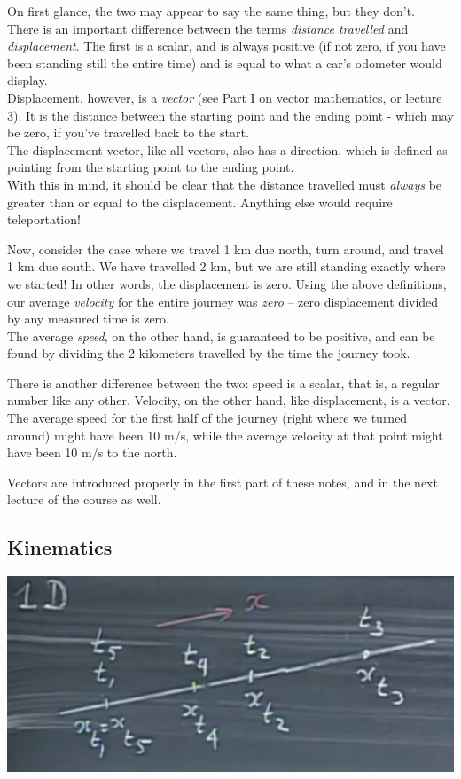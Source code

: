 \documentclass[12pt,a4paper]{report}
\begin{document}
On first glance, the two may appear to say the same thing, but they don't.\\
There is an important difference between the terms \emph{distance travelled} and \emph{displacement}. The first is a scalar, and is always positive (if not zero, if you have been standing still the entire time) and is equal to what a car's odometer would display.\\
Displacement, however, is a \emph{vector} (see Part I on vector mathematics, or lecture 3). It is the distance between the starting point and the ending point - which may be zero, if you've travelled back to the start.\\
The displacement vector, like all vectors, also has a direction, which is defined as pointing from the starting point to the ending point.\\
With this in mind, it should be clear that the distance travelled must \emph{always} be greater than or equal to the displacement. Anything else would require teleportation!

Now, consider the case where we travel 1 km due north, turn around, and travel 1 km due south. We have travelled 2 km, but we are still standing exactly where we started! In other words, the displacement is zero. Using the above definitions, our average \emph{velocity} for the entire journey was \emph{zero} -- zero displacement divided by any measured time is zero.\\
The average \emph{speed}, on the other hand, is guaranteed to be positive, and can be found by dividing the 2 kilometers travelled by the time the journey took.

There is another difference between the two: speed is a scalar, that is, a regular number like any other. Velocity, on the other hand, like displacement, is a vector.\\
The average speed for the first half of the journey (right where we turned around) might have been 10 m/s, while the average velocity at that point might have been 10 m/s to the north.

Vectors are introduced properly in the first part of these notes, and in the next lecture of the course as well.

\subsection{Kinematics}

\begin{center}
\includegraphics[scale=0.75]{Graphics/1d-motion}
\end{center}
\end{document}
